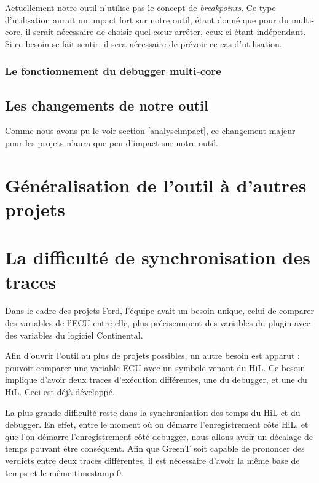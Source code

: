 \begin{remarque}
Actuellement notre outil n'utilise pas le concept de \textit{breakpoints}. Ce type d'utilisation aurait un impact fort sur notre outil, étant donné que pour du multi-core, il serait nécessaire de choisir quel c\oe{}ur arrêter, ceux-ci étant indépendant. Si ce besoin se fait sentir, il sera nécessaire de prévoir ce cas d'utilisation.
\end{remarque}

\subsubsection{Le fonctionnement du debugger multi-core}

\subsection{Les changements de notre outil}
Comme nous avons pu le voir section \ref{analyseimpact}, ce changement majeur pour les projets n'aura que peu d'impact sur notre outil. 
\section{Généralisation de l'outil à d'autres projets} \label{gttestplan}

\section{La difficulté de synchronisation des traces}\label{synchro}	
Dans le cadre des projets Ford, l'équipe avait un besoin unique, celui de comparer des variables de l'ECU entre elle, plus précisemment des variables du plugin avec des variables du logiciel Continental.

Afin d'ouvrir l'outil au plus de projets possibles, un autre besoin est apparut : pouvoir comparer une variable ECU avec un symbole venant du HiL. Ce besoin implique d'avoir deux traces d'exécution différentes, une du debugger, et une du HiL. Ceci est déjà développé. 

La plus grande difficulté reste dans la synchronisation des temps du HiL et du debugger. En effet, entre le moment où on démarre l'enregistrement côté HiL, et que l'on démarre l'enregistrement côté debugger, nous allons avoir un décalage de temps pouvant être conséquent. Afin que GreenT soit capable de prononcer des verdicts entre deux traces différentes, il est nécessaire d'avoir la même base de temps et le même timestamp 0. 

